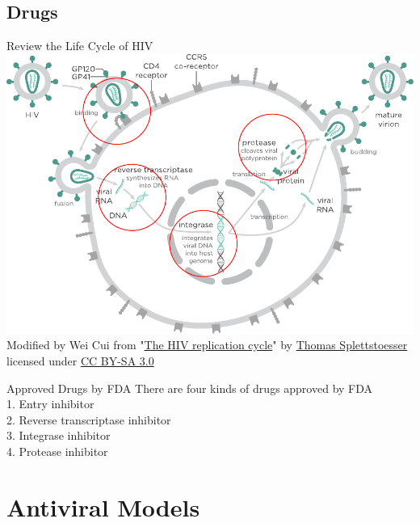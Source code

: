 \documentclass[9pt]{beamer}
\begin{document}
\subsection[Drugs]{Drugs}
\begin{frame}{Review the Life Cycle of HIV}
\includegraphics[scale=0.65]{HIV-replication-cycle-modify} \\
Modified by Wei Cui from "\href{http://en.wikipedia.org/wiki/HIV\#/media/File:HIV-replication-cycle.svg}{The HIV replication cycle}" by \href{http://commons.wikimedia.org/wiki/User:Splette}{Thomas Splettstoesser} licensed under \href{http://creativecommons.org/licenses/by-sa/3.0/}{CC BY-SA 3.0}
\end{frame}

\begin{frame}{Approved Drugs by FDA}
There are four kinds of drugs approved by FDA \\
1. Entry inhibitor \\
2. Reverse transcriptase inhibitor \\
3. Integrase inhibitor \\
4. Protease inhibitor 
\end{frame}

\section[Models]{Antiviral Models}
\end{document}
